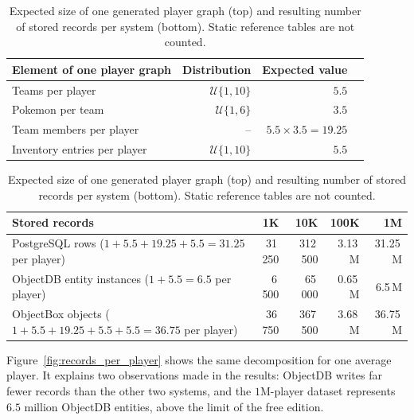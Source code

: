 \documentclass{article}
\begin{document}
\begin{table}[H]
    \centering
    \small
    \begin{tabular}{lrrr}
        \toprule
        \textbf{Element of one player graph} & \textbf{Distribution} & \textbf{Expected value} \\
        \midrule
        Teams per player                     & $\mathcal{U}\{1,10\}$ & $5.5$                   \\
        Pokemon per team                     & $\mathcal{U}\{1,6\}$  & $3.5$                   \\
        Team members per player              & --                    & $5.5 \times 3.5 = 19.25$ \\
        Inventory entries per player         & $\mathcal{U}\{1,10\}$ & $5.5$                   \\
        \bottomrule
    \end{tabular}

    \vspace{4mm}

    \begin{tabular}{lrrrr}
        \toprule
        \textbf{Stored records}                                                     & \textbf{1K}   & \textbf{10K} & \textbf{100K} & \textbf{1M}  \\
        \midrule
        PostgreSQL rows ($1 + 5.5 + 19.25 + 5.5 = 31.25$ per player)                & 31\,250       & 312\,500     & 3.13\,M       & 31.25\,M     \\
        ObjectDB entity instances ($1 + 5.5 = 6.5$ per player)                      & 6\,500        & 65\,000      & 0.65\,M       & 6.5\,M       \\
        ObjectBox objects ($1 + 5.5 + 19.25 + 5.5 + 5.5 = 36.75$ per player)        & 36\,750       & 367\,500     & 3.68\,M       & 36.75\,M     \\
        \bottomrule
    \end{tabular}
    \caption{Expected size of one generated player graph (top) and resulting number of stored records per system (bottom). Static reference tables are not counted.}
    \label{tab:workload}
\end{table}

Figure~\ref{fig:records_per_player} shows the same decomposition for one average player. It explains two observations made in the results: ObjectDB writes far fewer records than the other two systems, and the $1$M-player dataset represents $6.5$ million ObjectDB entities, above the limit of the free edition.
\end{document}
